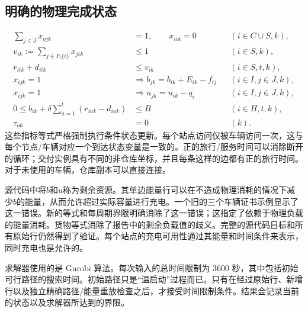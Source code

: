 \documentclass{article}
\begin{document}
\subsection*{明确的物理完成状态}
\begin{align}
\sum_{j\in J}x_{ojk}&=1,\qquad x_{iik}=0&&(i\in C\cup S,k),\\
v_{ik}:=\sum_{j\in I\setminus\{i\}}x_{jik}&\le1&&(i\in S,k),\\
r_{itk}+d_{itk}&\le v_{ik}&&(i\in S,t,k),\\
x_{ijk}=1&\Longrightarrow b_{jk}=b_{ik}+E_{ik}-f_{ij}&&(i\in I,j\in J,k),\\
x_{ijk}=1&\Longrightarrow u_{jk}=u_{ik}-q_i&&(i\in I,j\in J,k),\\
0\le b_{ik}+\delta\sum_{a=1}^{t}(r_{iak}-d_{iak})&\le B&&(i\in H,t,k),\\
\tau_{ok}&=0&&(k).
\end{align}
这些指标等式严格强制执行条件状态更新。每个站点访问仅被车辆访问一次，这与每个节点/车辆对应一个到达状态变量是一致的。正的旅行/服务时间可以消除断开的循环；交付实例具有不同的非仓库坐标，并且每条这样的边都有正的旅行时间。对于未使用的车辆，仓库副本可以直接连接。

源代码中将$b$和$u$称为剩余资源。其单边能量行可以在不造成物理消耗的情况下减少$b$的能量，从而允许超过实际容量进行充电。一个旧的三个车辆证书示例显示了这一错误。新的等式和每周期界限明确消除了这一错误；这指定了依赖于物理负载的能量消耗。货物等式消除了报告中的剩余负载值的歧义。完整的源代码目标和所有原始行仍然得到了验证。每个站点的充电可用性通过其能量和时间条件来表示，同时充电也是允许的。

求解器使用的是 Gurobi 算法。每次输入的总时间限制为 3600 秒，其中包括初始可行路径的搜索时间。初始路径只是“温启动”过程而已。只有在经过原始行、新增行以及独立精确路径/能量重放检查之后，才接受时间限制条件。结果会记录当前的状态以及求解器所达到的界限。
\end{document}
